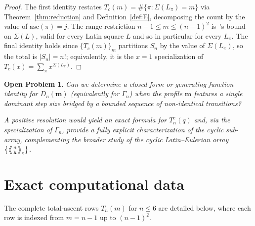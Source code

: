 \documentclass[11pt,a4paper]{amsart}
\newtheorem{remark}[theorem]{Remark}
\newtheorem{question}[theorem]{Open Problem}
\newcommand{\1}{\mathbf{1}}
\newcommand{\LE}[1]{\left\langle\!\!\left\langle #1 \right\rangle\!\!\right\rangle}
\begin{document}
\begin{proof}
The first identity restates $T_c(m)=\#\{\pi:\Sigma(L_\pi)=m\}$ via Theorem~\ref{thm:reduction} and Definition~\ref{def:E}, decomposing the count by the value of $\mathrm{asc}(\pi)=j$. The range restriction $n-1\le m\le(n-1)^2$ is~\cite[Thm.~4.4]{LEN}'s bound on $\Sigma(L)$, valid for every Latin square $L$ and so in particular for every $L_\pi$. The final identity holds since $\{T_c(m)\}_m$ partitions $S_n$ by the value of $\Sigma(L_\pi)$, so the total is $|S_n|=n!$; equivalently, it is the $x=1$ specialization of $T_c(x)=\sum_\pi x^{\Sigma(L_\pi)}$.
\end{proof}

\begin{question}\label{q:dominant-bridge}
Can we determine a closed form or generating-function identity for $D_n(\mathbf{m})$ (equivalently for $\Gamma_n$) when the profile $\mathbf{m}$ features a single dominant step size bridged by a bounded sequence of non-identical transitions?

A positive resolution would yield an exact formula for $T_n^c(q)$ and, via the specialization of $\Gamma_n$, provide a fully explicit characterization of the cyclic sub-array, complementing the broader study of the cyclic Latin--Eulerian array $\left\{\LE{n\atop\mathbf k}_c\right\}$.
\end{question}
\section{Exact computational data}

The complete total-ascent rows $T_n(m)$ for $n \le 6$ are detailed below, where each row is indexed from $m = n-1$ up to $(n-1)^2$.
\end{document}
